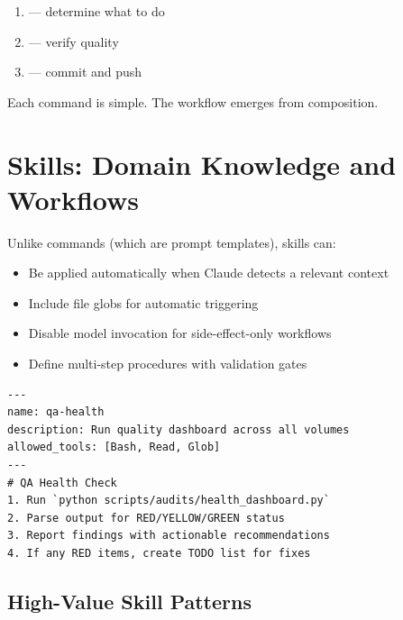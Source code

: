 
\begin{enumerate}
  \item {} --- determine what to do
  \item {} --- verify quality
  \item {} --- commit and push
\end{enumerate}

Each command is simple. The workflow emerges from composition.

\section{Skills: Domain Knowledge and Workflows}
\label{sec:skills}


Unlike commands (which are prompt templates), skills can:

\begin{itemize}
  \item Be applied automatically when Claude detects a relevant context
  \item Include file globs for automatic triggering
  \item Disable model invocation for side-effect-only workflows
  \item Define multi-step procedures with validation gates
\end{itemize}

\begin{verbatim}
---
name: qa-health
description: Run quality dashboard across all volumes
allowed_tools: [Bash, Read, Glob]
---
# QA Health Check
1. Run `python scripts/audits/health_dashboard.py`
2. Parse output for RED/YELLOW/GREEN status
3. Report findings with actionable recommendations
4. If any RED items, create TODO list for fixes
\end{verbatim}

\subsection{High-Value Skill Patterns}

